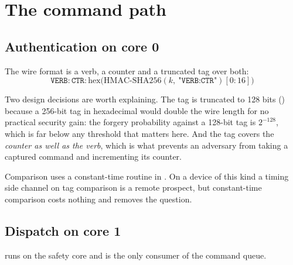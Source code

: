 \section{The command path}\label{sec:impl-cmd}

\subsection{Authentication on core 0}

The wire format is a verb, a counter and a truncated tag over both:
\[
\texttt{VERB}:\texttt{CTR}:\mathrm{hex}\bigl(\mathrm{HMAC\text{-}SHA256}(k,\ \texttt{"VERB:CTR"})[0{:}16]\bigr)
\]

Two design decisions are worth explaining. The tag is truncated to 128 bits
() because a 256-bit tag in hexadecimal would double the wire
length for no practical security gain: the forgery probability against a 128-bit tag is
$2^{-128}$, which is far below any threshold that matters here. And the tag covers the
\emph{counter as well as the verb}, which is what prevents an adversary from taking a captured
command and incrementing its counter.

Comparison uses a constant-time routine in . On a device of this kind a timing
side channel on tag comparison is a remote prospect, but constant-time comparison costs
nothing and removes the question.

\subsection{Dispatch on core 1}

 runs on the safety core and is the only consumer of the command queue.

